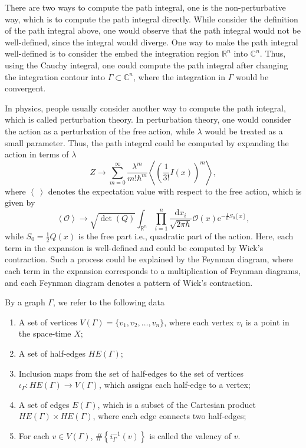 \documentclass[10pt]{article}
\begin{document}
There are two ways to compute the path integral, one is the non-perturbative way, which is to compute the path integral directly.
While consider the definition of the path integral above, one would observe that the path integral would not be well-defined, since the integral would diverge.
One way to make the path integral well-defined is to consider the embed the integration region $ \mathbb{R}^{n}$ into $ \mathbb{C}^{n}$.
Thus, using the Cauchy integral, one could compute the path integral after changing the integration contour into $ \Gamma \subset \mathbb{C}^{n}$, where the integration in $ \Gamma$ would be convergent.


In physics, people usually consider another way to compute the path integral, which is called perturbation theory.
In perturbation theory, one would consider the action as a perturbation of the free action, while $ \lambda$ would be treated as a small parameter.
Thus, the path integral could be computed by expanding the action in terms of $ \lambda$
\begin{equation*}
  Z \rightarrow \sum_{m=0}^{\infty } \frac{\lambda^{m}}{m! \hbar^{m}} \left< \left( \frac{1}{3!} I(x) \right)^{m} \right>,
\end{equation*}
where $\left< ~ \right>$ denotes the expectation value with respect to the free action, which is given by
\begin{equation*}
  \left< \mathcal{O} \right> \rightarrow \sqrt{\det(Q)} \int _{\mathbb{R}^{n}} \prod_{i=1}^{n} \frac{\mathrm{d} x_i}{\sqrt{2 \pi \hbar}} \mathcal{O}(x) \mathrm{e}^{- \frac{1}{\hbar} S_0[x]},
\end{equation*}
while $ S_0 = \frac{1}{2} Q(x)$ is the free part i.e., quadratic part of the action.
Here, each term in the expansion is well-defined and could be computed by Wick's contraction.
Such a process could be explained by the Feynman diagram, where each term in the expansion corresponds to a multiplication of  Feynman diagrams, and each Feynman diagram denotes a pattern of Wick's contraction.

\begin{definition}[Diagram]
  By a graph $ \Gamma$,  we refer to the following data
  \begin{enumerate}[(1)]
    \item A set of vertices $ V(\Gamma) = \{ v_1, v_2, \ldots, v_n \}$, where each vertex $ v_i$ is a point in the space-time $ X$;
    \item A set of half-edges $ HE(\Gamma)$;
    \item Inclusion maps from the set of half-edges to the set of vertices $ \iota_{\Gamma}: HE(\Gamma) \rightarrow V(\Gamma)$, which assigns each half-edge to a vertex;
    \item A set of edges $ E(\Gamma)$, which is a subset of the Cartesian product $ HE(\Gamma) \times HE(\Gamma)$, where each edge connects two half-edges;
    \item For each $ v \in V(\Gamma)$, $\# \left\{ i^{-1}_{\Gamma} (v) \right\}$ is called the valency of $ v$.
  \end{enumerate}
\end{definition}
\end{document}
